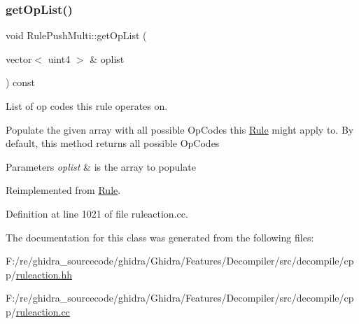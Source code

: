 \subsubsection{\texorpdfstring{getOpList()}{getOpList()}}
{\footnotesize\ttfamily void Rule\+Push\+Multi\+::get\+Op\+List (\begin{DoxyParamCaption}\item[{vector$<$ uint4 $>$ \&}]{oplist }\end{DoxyParamCaption}) const\hspace{0.3cm}{\ttfamily [virtual]}}



List of op codes this rule operates on. 

Populate the given array with all possible Op\+Codes this \mbox{\hyperlink{class_rule}{Rule}} might apply to. By default, this method returns all possible Op\+Codes 
\begin{DoxyParams}{Parameters}
{\em oplist} & is the array to populate \\
\hline
\end{DoxyParams}


Reimplemented from \mbox{\hyperlink{class_rule_a4023bfc7825de0ab866790551856d10e}{Rule}}.



Definition at line 1021 of file ruleaction.\+cc.



The documentation for this class was generated from the following files\+:\begin{DoxyCompactItemize}
\item 
F\+:/re/ghidra\+\_\+sourcecode/ghidra/\+Ghidra/\+Features/\+Decompiler/src/decompile/cpp/\mbox{\hyperlink{ruleaction_8hh}{ruleaction.\+hh}}\item 
F\+:/re/ghidra\+\_\+sourcecode/ghidra/\+Ghidra/\+Features/\+Decompiler/src/decompile/cpp/\mbox{\hyperlink{ruleaction_8cc}{ruleaction.\+cc}}\end{DoxyCompactItemize}
